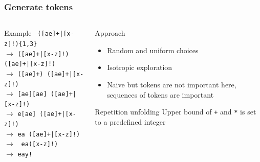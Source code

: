 \documentclass[9pt]{beamer}
\newcommand{\lighter}[1]{{\color{gray} #1}}
\newcommand{\code}[1]{\texttt{#1}}
\begin{document}
\begin{frame}[t]
\frametitle{Generate tokens}

\begin{columns}[t]

\begin{column}{.55\textwidth}
\begin{exampleblock}{Example}
\onslide<+->
\code{\lighter{([ae]+|[x-z]!)}\{1,3\}} \\
\onslide<+->
\quad $\rightarrow$ \code{([ae]+|[x-z]!)\lighter{([ae]+|[x-z]!)}} \\
\onslide<+->
\quad $\rightarrow$ \code{([ae]+)\lighter{([ae]+|[x-z]!)}} \\
\onslide<+->
\quad $\rightarrow$ \code{[ae][ae]\lighter{([ae]+|[x-z]!)}} \\
\onslide<+->
\quad $\rightarrow$ \code{e[ae]\lighter{([ae]+|[x-z]!)}} \\
\onslide<+->
\quad $\rightarrow$ \code{ea\lighter{([ae]+|[x-z]!)}} \\
\onslide<+->
\quad $\rightarrow$ \code{\lighter{ea}([x-z]!)} \\
\onslide<+>
\quad $\rightarrow$ \code{eay!} \\
\end{exampleblock}
\end{column}

\begin{column}{.45\textwidth}
\begin{block}{Approach}
\begin{itemize}
\item Random and uniform choices
\item Isotropic exploration
\item Naive but tokens are not important here, sequences of tokens are important
\end{itemize}
\end{block}

\begin{block}{Repetition unfolding}
Upper bound of \code{+} and \code{*} is set to a predefined integer
\end{block}
\end{column}

\end{columns}

\end{frame}
\end{document}
